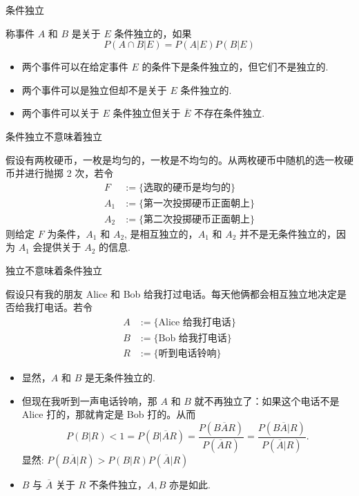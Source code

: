\begin{frame}{条件独立}
\begin{defi}
称事件 $A$ 和 $B$ 是关于 $E$ 条件独立的，如果 $$P (A\cap B|E)=P (A|E) P (B|E)$$
\end{defi}
\pause
\begin{itemize}[<+-|alert@+>]
\item 两个事件可以在给定事件 $E$ 的条件下是条件独立的，但它们不是独立的.
\item 两个事件可以是独立但却不是关于 $E$ 条件独立的.
\item 两个事件可以关于 $E$ 条件独立但关于 $\overline{E}$ 不存在条件独立.
\end{itemize}
\end{frame}

\begin{frame}{条件独立不意味着独立}
\begin{exam}
假设有两枚硬币，一枚是均匀的，一枚是不均匀的。从两枚硬币中随机的选一枚硬币并进行抛掷 2 次，若令
\begin{align*}
  F &:=\{\mbox{选取的硬币是均匀的}\}\\
   A_{1}&:= \{\mbox{第一次投掷硬币正面朝上}\}\\
   A_{2}&:= \{\mbox{第二次投掷硬币正面朝上}\}
\end{align*}
则给定 $F$ 为条件，$A_1$ 和 $A_2$, 是相互独立的，$A_1$ 和 $A_2$ 并不是无条件独立的，因为 $A_1$ 会提供关于 $A_2$ 的信息.
\end{exam}
\end{frame}

\begin{frame}{独立不意味着条件独立}
\begin{exam}
假设只有我的朋友 Alice 和 Bob 给我打过电话。每天他俩都会相互独立地决定是否给我打电话。若令
\begin{align*}
	 A&:= \{\mbox{Alice 给我打电话}\}\\
	 B&:= \{\mbox{Bob 给我打电话}\}\\
     R&:=\{\mbox{听到电话铃响}\}
  \end{align*}
  \pause
  \begin{itemize}[<+-|alert@+>]
  \item 显然，$A$ 和 $B$ 是无条件独立的.
  \item 但现在我听到一声电话铃响，那 $A$ 和 $B$ 就不再独立了：如果这个电话不是 Alice 打的，那就肯定是 Bob 打的。从而 \pause
  $$P(B|R)<1=P(B|\overline{A}R)= \frac{P(B\overline{A}R)}{P(\overline{A}R)}= \frac{P(B\overline{A}|R)}{P(\overline{A}|R)}.$$
  显然: $P (B\overline{A}|R)>P (B|R) P (\overline{A}|R)$
  \item $B$ 与 $\overline{A}$ 关于 $R$ 不条件独立，$A,B$ 亦是如此.
  \end{itemize}

\end{exam}
\end{frame}

